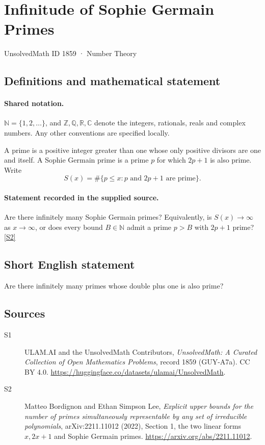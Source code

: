 \documentclass[11pt]{article}
\newcommand{\sref}[2]{\hyperlink{source:#1:#2}{[S#2]}}
\begin{document}
\setcounter{section}{1858}
\section{Infinitude of Sophie Germain Primes}\label{1859}
{\small\sffamily UnsolvedMath ID 1859 · Number Theory}
\subsection{Definitions and mathematical statement}

\paragraph{Shared notation.}$\mathbb N=\{1,2,\ldots\}$, and $\mathbb Z,\mathbb Q,\mathbb R,\mathbb C$ denote the integers, rationals, reals and complex numbers. Any other conventions are specified locally.


A prime is a positive integer greater than one whose only
positive divisors are one and itself. A Sophie Germain prime is a prime
\(p\) for which \(2p+1\) is also prime. Write
\[
 S(x)=\#\{p\le x:p\text{ and }2p+1\text{ are prime}\}.
\]
\paragraph{Statement recorded in the supplied source.}
Are there infinitely many Sophie Germain primes?
Equivalently, is \(S(x)\to\infty\) as \(x\to\infty\), or does every
bound \(B\in\mathbb N\) admit a prime \(p>B\) with \(2p+1\) prime? \sref{1859}{2}
\subsection{Short English statement}
Are there infinitely many primes whose double plus one is also prime?
\subsection{Sources}
\begin{description}
\item[\hypertarget{source:1859:1}{S1}] ULAM.AI and the UnsolvedMath Contributors, \emph{UnsolvedMath: A Curated Collection of Open Mathematics Problems}, record 1859 (GUY-A7a). CC BY 4.0. \url{https://huggingface.co/datasets/ulamai/UnsolvedMath}.
\item[\hypertarget{source:1859:2}{S2}] Matteo Bordignon and Ethan Simpson Lee, \emph{Explicit upper bounds for the number of primes simultaneously representable by any set of irreducible polynomials}, arXiv:2211.11012 (2022), Section 1, the two linear forms $x,2x+1$ and Sophie Germain primes. \url{https://arxiv.org/abs/2211.11012}.
\end{description}
\label{end:1859}
\end{document}
